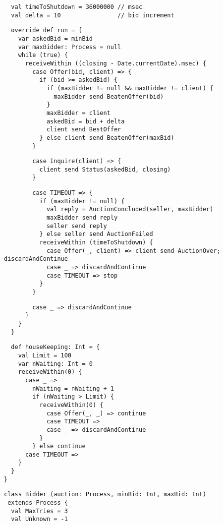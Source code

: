 {\begin{lstlisting}
  val timeToShutdown = 36000000 // msec
  val delta = 10                // bid increment
\end{lstlisting}
\begin{lstlisting}
  override def run = {
    var askedBid = minBid
    var maxBidder: Process = null
    while (true) {
      receiveWithin ((closing - Date.currentDate).msec) {
        case Offer(bid, client) => {
          if (bid >= askedBid) {
            if (maxBidder != null && maxBidder != client) {
              maxBidder send BeatenOffer(bid)
            }
            maxBidder = client
            askedBid = bid + delta
            client send BestOffer
          } else client send BeatenOffer(maxBid)
        }
\end{lstlisting}
\begin{lstlisting}
        case Inquire(client) => {
          client send Status(askedBid, closing)
        }
\end{lstlisting}
\begin{lstlisting}
        case TIMEOUT => {
          if (maxBidder != null) {
            val reply = AuctionConcluded(seller, maxBidder)
            maxBidder send reply
            seller send reply
          } else seller send AuctionFailed
          receiveWithin (timeToShutdown) {
            case Offer(_, client) => client send AuctionOver; discardAndContinue
            case _ => discardAndContinue
            case TIMEOUT => stop
          }
        }
\end{lstlisting}
\begin{lstlisting}
        case _ => discardAndContinue
      }
    }
  }
\end{lstlisting}
\begin{lstlisting}
  def houseKeeping: Int = {
    val Limit = 100
    var nWaiting: Int = 0
    receiveWithin(0) {
      case _ =>
        nWaiting = nWaiting + 1
        if (nWaiting > Limit) {
          receiveWithin(0) {
            case Offer(_, _) => continue
            case TIMEOUT =>
            case _ => discardAndContinue
          }
        } else continue
      case TIMEOUT =>
    }
  }
}
\end{lstlisting}
\begin{lstlisting}
class Bidder (auction: Process, minBid: Int, maxBid: Int)
 extends Process {
  val MaxTries = 3
  val Unknown = -1


\end{lstlisting}}
